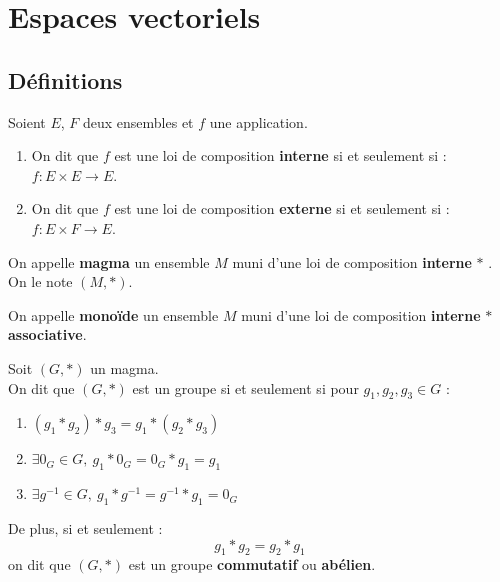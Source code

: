 \chapter{Espaces vectoriels}\label{chap:espaces_vectoriels}
\def\arraystretch{1}

\section{Définitions}
\begin{definition}
	Soient $E$, $F$ deux ensembles et $f$ une application.
	\begin{enumerate}
		\item On dit que $f$ est une loi de composition \textbf{interne} si et seulement si : $f : E \times E \to E$.
		\item On dit que $f$ est une loi de composition \textbf{externe} si et seulement si : $f : E \times F \to E$.
	\end{enumerate}
\end{definition}

\begin{definition}[Magma]
	On appelle \textbf{magma} un ensemble $M$ muni d'une loi de composition \textbf{interne} \og $*$ \fg. 
	\\
	On le note $(M, *)$.
\end{definition}

\begin{definition}
	On appelle \textbf{monoïde} un ensemble $M$ muni d'une loi de composition \textbf{interne} \og $*$ \fg \textbf{associative}.
\end{definition}

\begin{definition}[Groupe]
	Soit $(G, *)$ un magma.
	\\ 
	On dit que $(G, *)$ est un groupe si et seulement si pour $g_1, g_2, g_3 \in G$ : 
    \begin{enumerate}
    		\item $(g_1 * g_2) * g_3 = g_1 * (g_2 * g_3)$
    		\item $\exists 0_G \in G,\ g_1 * 0_G = 0_G * g_1 = g_1$
    		\item $\exists g^{-1} \in G,\ g_1 * g^{-1} = g^{-1} * g_1 = 0_G$
    	\end{enumerate}
    \noindent De plus, si et seulement :
    \[ g_1 * g_2 = g_2* g_1 \]
    on dit que $(G, *)$ est un groupe \textbf{commutatif} ou \textbf{abélien}.
\end{definition}

